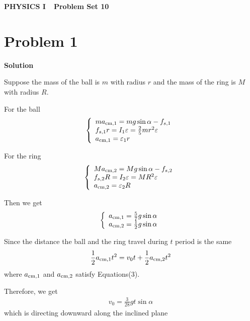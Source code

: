 \documentclass[12pt,a4paper]{article}
\begin{document}
\centerline{\Huge{{\textbf{PHYSICS I\ \ Problem Set 10}}}}
\vspace{0.5cm}
\section*{\large \textbf{Problem 1}}
{\textbf{Solution}}

Suppose the mass of the ball is $m$ with radius $r$ and the mass of the ring is $M$ with radius $R$.

For the ball
\begin{align}
	\left\{
	\begin{array}{l}		
			ma_{\rm cm,1} = mg\sin\alpha - f_{s,1}\\
			f_{s,1} r = I_1\varepsilon = \frac{2}{5}mr^2\varepsilon\\
			a_{\rm cm,1} = \varepsilon_1 r
	\end{array}
	\right.
\end{align}

For the ring
\begin{align}
	\left\{
	\begin{array}{l}
			Ma_{\rm cm,2} = Mg\sin\alpha - f_{s,2}\\
			f_{s,2} R = I_2\varepsilon = MR^2\varepsilon\\
			a_{\rm cm,2} = \varepsilon_2 R
	\end{array}
	\right.
\end{align}

Then we get
\begin{align}
	\left\{
	\begin{array}{l}
		a_{\rm cm,1} = \frac{5}{7}g\sin\alpha\\
		a_{\rm cm,2} = \frac{1}{2}g\sin\alpha
	\end{array}
	\right.
\end{align}

Since the distance the ball and the ring travel during $t$ period is the same
\begin{align}
	\frac{1}{2}a_{\rm cm,1} t^2 = v_0 t + \frac{1}{2}a_{\rm cm,2} t^2
\end{align}
where $a_{\rm cm,1}$ and $a_{\rm cm,2}$ satisfy Equations(3).

Therefore, we get
\begin{align}
	v_0 = \frac{3}{28}gt\sin\alpha
\end{align}
which is directing downward along the inclined plane
\end{document}
